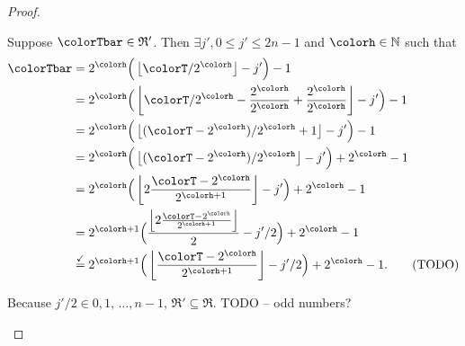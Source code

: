 \begin{proof}
\begin{proofpart}
Suppose $\colorTbar \in \mathfrak{R}'$.
Then $\exists j',  0 \leq j' \leq 2n - 1$ and $\colorh \in \mathbb{N}$ such that
\begin{align*}
\colorTbar
&= 2^{\colorh}\Big(\left\lfloor \colorT / 2^{\colorh} \right\rfloor - j'\Big) - 1\\
&= 2^{\colorh}\Big(\left\lfloor \colorT / 2^{\colorh} - \frac{2^{\colorh}}{2^{\colorh}} + \frac{2^{\colorh}}{2^{\colorh}} \right\rfloor - j'\Big) - 1\\
&= 2^{\colorh}\Big(\left\lfloor (\colorT - 2^{\colorh}) / 2^{\colorh}  + 1 \right\rfloor - j'\Big) - 1\\
&= 2^{\colorh}\Big(\left\lfloor (\colorT - 2^{\colorh}) / 2^{\colorh} \right\rfloor - j'\Big) + 2^{\colorh} - 1\\
&= 2^{\colorh}\Big(\left\lfloor 2\frac{\colorT - 2^{\colorh}}{2^{\colorh+1}} \right\rfloor - j'\Big) + 2^{\colorh} - 1\\
&= 2^{\colorh+1}\Big(
  \frac{\left\lfloor 2\frac{\colorT - 2^{\colorh}}{2^{\colorh+1}} \right\rfloor}{2} - j'/2
\Big) + 2^{\colorh} - 1\\
&\stackrel{\checkmark}{=} 2^{\colorh+1}\Big(
  \left\lfloor\frac{\colorT - 2^{\colorh}}{2^{\colorh+1}} \right\rfloor - j'/2
\Big) + 2^{\colorh} - 1.  \tag{TODO}
\end{align*}


Because $j'/2 \in 0,1,\,\ldots,n-1$,  $\mathfrak{R}' \subseteq \mathfrak{R}$. TODO -- odd numbers?
\end{proofpart}
\end{proof}
